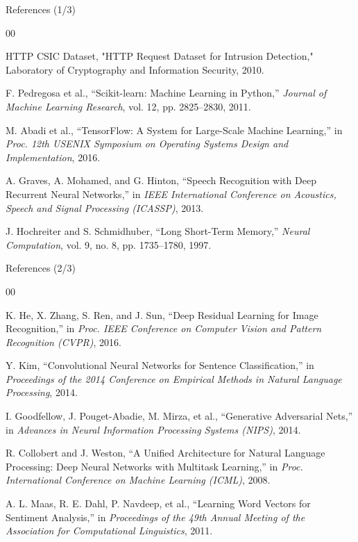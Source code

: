 \documentclass[aspectratio=169,xcolor=dvipsnames]{beamer}
\begin{document}

\begin{frame}{References (1/3)}
\small
\begin{thebibliography}{00}

\bibitem{}
HTTP CSIC Dataset, "HTTP Request Dataset for Intrusion Detection," Laboratory of Cryptography and Information Security, 2010.

\bibitem{}
F. Pedregosa et al.,
``Scikit-learn: Machine Learning in Python,''
\textit{Journal of Machine Learning Research}, vol. 12, pp. 2825--2830, 2011.

\bibitem{}
M. Abadi et al.,
``TensorFlow: A System for Large-Scale Machine Learning,''
in \textit{Proc. 12th USENIX Symposium on Operating Systems Design and Implementation}, 2016.

\bibitem{}
A. Graves, A. Mohamed, and G. Hinton,
``Speech Recognition with Deep Recurrent Neural Networks,''
in \textit{IEEE International Conference on Acoustics, Speech and Signal Processing (ICASSP)}, 2013.

\bibitem{}
J. Hochreiter and S. Schmidhuber,
``Long Short-Term Memory,''
\textit{Neural Computation}, vol. 9, no. 8, pp. 1735--1780, 1997.

\end{thebibliography}
\end{frame}

\begin{frame}{References (2/3)}
\small
\begin{thebibliography}{00}

\bibitem{}
K. He, X. Zhang, S. Ren, and J. Sun,
``Deep Residual Learning for Image Recognition,''
in \textit{Proc. IEEE Conference on Computer Vision and Pattern Recognition (CVPR)}, 2016.

\bibitem{}
Y. Kim,
``Convolutional Neural Networks for Sentence Classification,''
in \textit{Proceedings of the 2014 Conference on Empirical Methods in Natural Language Processing}, 2014.

\bibitem{}
I. Goodfellow, J. Pouget-Abadie, M. Mirza, et al.,
``Generative Adversarial Nets,''
in \textit{Advances in Neural Information Processing Systems (NIPS)}, 2014.

\bibitem{}
R. Collobert and J. Weston,
``A Unified Architecture for Natural Language Processing: Deep Neural Networks with Multitask Learning,''
in \textit{Proc. International Conference on Machine Learning (ICML)}, 2008.

\bibitem{}
A. L. Maas, R. E. Dahl, P. Navdeep, et al.,
``Learning Word Vectors for Sentiment Analysis,''
in \textit{Proceedings of the 49th Annual Meeting of the Association for Computational Linguistics}, 2011.

\end{thebibliography}
\end{frame}
\end{document}
